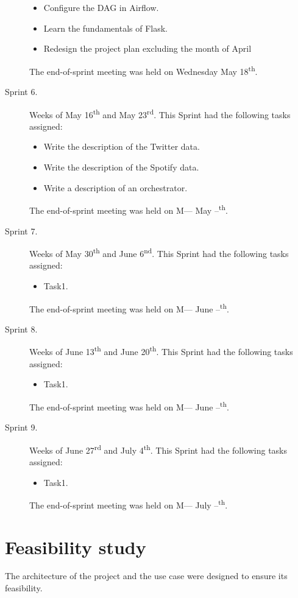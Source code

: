 \begin{description}
	\begin{itemize}
		\item Configure the DAG in Airflow.
		\item Learn the fundamentals of Flask.
		\item Redesign the project plan excluding the month of April
	\end{itemize}
	The end-of-sprint meeting was held on Wednesday May 18\textsuperscript{th}.
	\item[Sprint 6.] Weeks of May 16\textsuperscript{th} and May 23\textsuperscript{rd}. This Sprint had the following tasks assigned:
	\begin{itemize}
		\item Write the description of the Twitter data.
		\item Write the description of the Spotify data.
		\item Write a description of an orchestrator.
	\end{itemize}
	The end-of-sprint meeting was held on M--- May --\textsuperscript{th}.
	\item[Sprint 7.] Weeks of May 30\textsuperscript{th} and June 6\textsuperscript{nd}. This Sprint had the following tasks assigned:
	\begin{itemize}
		\item Task1.
	\end{itemize}
	The end-of-sprint meeting was held on M--- June --\textsuperscript{th}.
	\item[Sprint 8.] Weeks of June 13\textsuperscript{th} and June 20\textsuperscript{th}. This Sprint had the following tasks assigned:
	\begin{itemize}
		\item Task1.
	\end{itemize}
	The end-of-sprint meeting was held on M--- June --\textsuperscript{th}.
	\item[Sprint 9.] Weeks of June 27\textsuperscript{rd} and July 4\textsuperscript{th}. This Sprint had the following tasks assigned:
	\begin{itemize}
		\item Task1.
	\end{itemize}
	The end-of-sprint meeting was held on M--- July --\textsuperscript{th}.
\end{description}

\section{Feasibility study}
\nonzeroparskip The architecture of the project and the use case were designed to ensure its feasibility.

